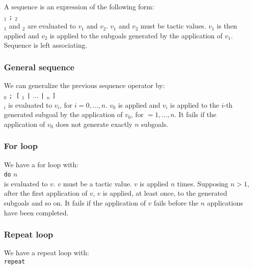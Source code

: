 A sequence is an expression of the following form:\\

{\tacexpr}$_1$ {\tt ;} {\tacexpr}$_2$\\

{\tacexpr}$_1$ and {\tacexpr}$_2$ are evaluated to $v_1$ and
$v_2$. $v_1$ and $v_2$ must be tactic values. $v_1$ is then applied
and $v_2$ is applied to the subgoals generated by the application of
$v_1$. Sequence is left associating.

\subsubsection{General sequence}
\tacindex{; [ | ]}

We can generalize the previous sequence operator by:\\

{\tacexpr}$_0$ {\tt ; [} {\tacexpr}$_1$ {\tt |} $...$ {\tt |}
{\tacexpr}$_n$ {\tt ]}\\

{\tacexpr}$_i$ is evaluated to $v_i$, for $i=0,...,n$. $v_0$ is
applied and $v_i$ is applied to the $i$-th generated subgoal by the
application of $v_0$, for $=1,...,n$. It fails if the application of
$v_0$ does not generate exactly $n$ subgoals.

\subsubsection{For loop}

We have a for loop with:\\

{\tt do} $n$ {\tacexpr}\\

{\tacexpr} is evaluated to $v$. $v$ must be a tactic value. $v$ is applied $n$
times. Supposing $n>1$, after the first application of $v$, $v$ is applied, at
least once, to the generated subgoals and so on. It fails if the application of
$v$ fails before the $n$ applications have been completed.

\subsubsection{Repeat loop}

We have a repeat loop with:\\

{\tt repeat} {\tacexpr}\\

